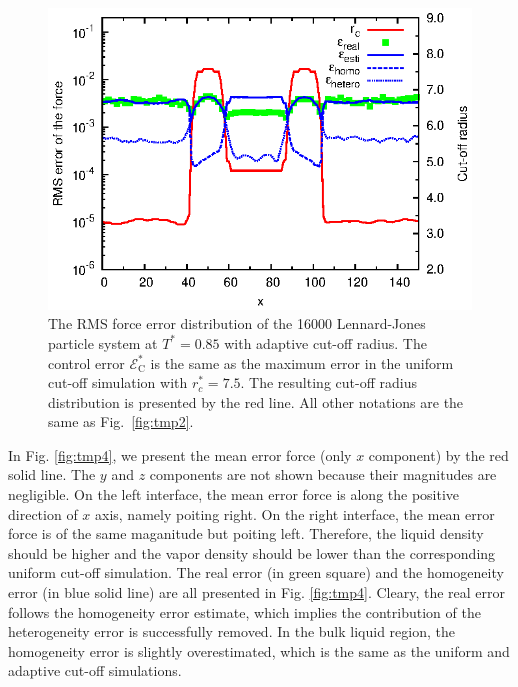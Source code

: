 \documentclass[aps,pre,preprint]{revtex4}
\begin{document}
\begin{figure}
  \centering
  \includegraphics[]{fig/t0.85-n16000-adapt-e0.0045-extend/rcut.and.error.eps}
  \caption{ The RMS force error distribution of the 16000
    Lennard-Jones particle system at $T^\ast=0.85$ with adaptive
    cut-off radius. The control error $\mathcal E^\ast_{\textrm{C}}$
    is the same as the maximum error in the uniform cut-off simulation
    with $r_c^\ast=7.5$.  The resulting cut-off radius distribution is
    presented by the red line. All other notations are the same as
    Fig.~\ref{fig:tmp2}.}
  \label{fig:tmp3}
\end{figure}


In Fig. \ref{fig:tmp4}, we present the mean error force (only $x$
component) by the red solid line. The $y$ and $z$ components are not
shown because their magnitudes are negligible.  On the left interface,
the mean error force is along the positive direction of $x$ axis,
namely poiting right.  On the right interface, the mean error force is
of the same maganitude but poiting left. Therefore, the liquid density
should be higher and the vapor density should be lower than the
corresponding uniform cut-off simulation.  The real error (in green
square) and the homogeneity error (in blue solid line) are all
presented in Fig. \ref{fig:tmp4}.  Cleary, the real error follows the
homogeneity error estimate, which implies the contribution of the
heterogeneity error is successfully removed. In the bulk liquid
region, the homogeneity error is slightly overestimated, which is the
same as the uniform and adaptive cut-off simulations.
\end{document}
